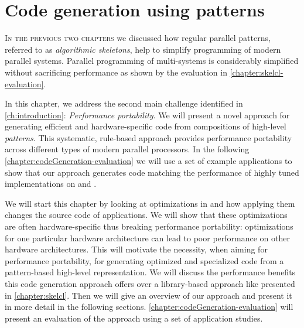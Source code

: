 
\chapter{Code generation using patterns}
%
%
%

\label{ch:fifth} %
\label{chapter:codeGeneration}

\lettrine[lines=3, loversize=0.1]{I}{n the previous two chapters} we discussed how regular parallel patterns, referred to as \emph{algorithmic skeletons}, help to simplify programming of modern parallel systems.
Parallel programming of multi-\GPU systems is considerably simplified without sacrificing performance as shown by the evaluation in \autoref{chapter:skelcl-evaluation}.

In this chapter, we address the second main challenge identified in \autoref{ch:introduction}: \emph{Performance portability}.
We will present a novel approach for generating efficient and hardware-specific code from compositions of high-level \emph{patterns}.
This systematic, rule-based approach provides performance portability across different types of modern parallel processors. 
In the following \autoref{chapter:codeGeneration-evaluation} we will use a set of example applications to show that our approach generates code matching the performance of highly tuned implementations on \CPUs and \GPUs.

We will start this chapter by looking at optimizations in \OpenCL and how applying them changes the source code of applications.
We will show that these optimizations are often hardware-specific thus breaking performance portability: optimizations for one particular hardware architecture can lead to poor performance on other hardware architectures.
This will motivate the necessity, when aiming for performance portability, for generating optimized and specialized code from a pattern-based high-level representation.
We will discuss the performance benefits this code generation approach offers over a library-based approach like \SkelCL presented in \autoref{chapter:skelcl}.
Then we will give an overview of our approach and present it in more detail in the following sections.
\autoref{chapter:codeGeneration-evaluation} will present an evaluation of the approach using a set of application studies.

